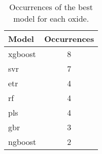 \begin{table}[H]
\centering
\begin{tabular}{lc}
Model & Occurrences \\
\hline
\gls{xgboost} & 8 \\
\gls{svr} & 7 \\
\gls{etr} & 4 \\
\gls{rf} & 4 \\
\gls{pls} & 4 \\
\gls{gbr} & 3 \\
\gls{ngboost} & 2 \\
\end{tabular}
\caption{Occurrences of the best model for each oxide.}
\label{tab:best_model_occurrences}
\end{table}
